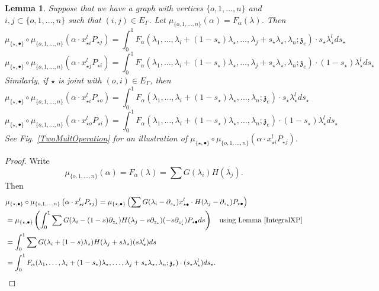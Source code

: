 \documentclass[11pt]{amsart}
\newtheorem{lem}[thm]{Lemma}
\theoremstyle{definition}
\theoremstyle{remark}
\numberwithin{equation}{section}
\begin{document}
\begin{lem}\label{IntegralS}
  Suppose that we have a graph with vertices $\{o,1,\dots,n\}$ and $i,j\subset \{o,1,\dots,n\}$ such that $(i,j)\in E_{\Gamma}$. Let $\mu_{\{o,1,\dots, n\}}\left(\alpha\right)=F_{\alpha}(\lambda)$. Then
  $$
  \mu_{\{\star,\bullet\}}\circ \mu_{\{o,1,\dots, n\}}\left(\alpha\cdot x^l_{\star i}P_{\star j }\right)=\int^1_0 F_{\alpha}(\lambda_1,\dots,\lambda_i+(1-s_{\star})\lambda_{\star},\dots,\lambda_j+s_{\star}\lambda_{\star},\lambda_{n};\mathfrak{z}_e)\cdot s_{\star}\lambda^l_{\star}ds_{\star}
  $$
    $$
  \mu_{\{\star,\bullet\}}\circ \mu_{\{o,1,\dots, n\}}\left(\alpha\cdot x^l_{\star j}P_{\star i }\right)=\int^1_0 F_{\alpha}(\lambda_1,\dots,\lambda_i+(1-s_{\star})\lambda_{\star},\dots,\lambda_j+s_{\star}\lambda_{\star},\lambda_{n};\mathfrak{z}_e)\cdot(1-s_{\star})\lambda^l_{\star}ds_{\star}
  $$
  Similarly, if $\star$ is joint with $(o,i)\in E_{\Gamma}$, then
  $$
  \mu_{\{\star,\bullet\}}\circ \mu_{\{o,1,\dots, n\}}\left(\alpha\cdot x^l_{\star i}P_{\star o }\right)=\int^1_0 F_{\alpha}(\lambda_1,\dots,\lambda_i+(1-s_{\star})\lambda_{\star},\dots,\lambda_{n};\mathfrak{z}_e)\cdot s_{\star}\lambda^l_{\star}ds_{\star}
  $$
   $$
  \mu_{\{\star,\bullet\}}\circ \mu_{\{o,1,\dots, n\}}\left(\alpha\cdot x^l_{\star o}P_{\star i}\right)=\int^1_0 F_{\alpha}(\lambda_1,\dots,\lambda_i+(1-s_{\star})\lambda_{\star},\dots,\lambda_{n};\mathfrak{z}_e)\cdot(1-s_{\star})\lambda^l_{\star}ds_{\star}
  $$
  See Fig. \ref{TwoMultOperation} for an illustration of $\mu_{\{\star,\bullet\}}\circ \mu_{\{o,1,\dots, n\}}\left(\alpha\cdot x^l_{\star i}P_{\star j }\right)$.
\end{lem}
\begin{proof}
  Write
  $$
\mu_{\{o,1,\dots, n\}}\left(\alpha\right)=F_{\alpha}(\lambda)=\sum G(\lambda_i)H(\lambda_j).
  $$
  Then
  \begin{align*}
   &  \mu_{\{\star,\bullet\}}\circ \mu_{\{o,1,\dots, n\}}\left(\alpha\cdot x^l_{\star i}P_{\star j }\right)=  \mu_{\{\star,\bullet\}}\left(\sum G(\lambda_i-\partial_{z_{\star}})x^l_{\star\bullet}\cdot H(\lambda_j-\partial_{z_{\star}})P_{\star\bullet}\right)\\
     &=\mu_{\{\star,\bullet\}}\left(\int^1_0\sum G(\lambda_i-(1-s)\partial_{z_{\star}}) H(\lambda_j-s\partial_{z_{\star}})(-s\partial_{z^l_{\star}})P_{\star\bullet}ds\right)\quad \text{using Lemma \ref{IntegralXP}}\\
     &=\int^1_0\sum G(\lambda_i+(1-s)\lambda_{\star}) H(\lambda_j+s\lambda_{\star})(s\lambda^l_{\star})ds\\
     &=\int^1_0 F_{\alpha}(\lambda_1,\dots,\lambda_i+(1-s_{\star})\lambda_{\star},\dots,\lambda_j+s_{\star}\lambda_{\star},\lambda_{n};\mathfrak{z}_e)\cdot(s_{\star}\lambda^l_{\star})ds_{\star}.
  \end{align*}
\end{proof}
\end{document}

